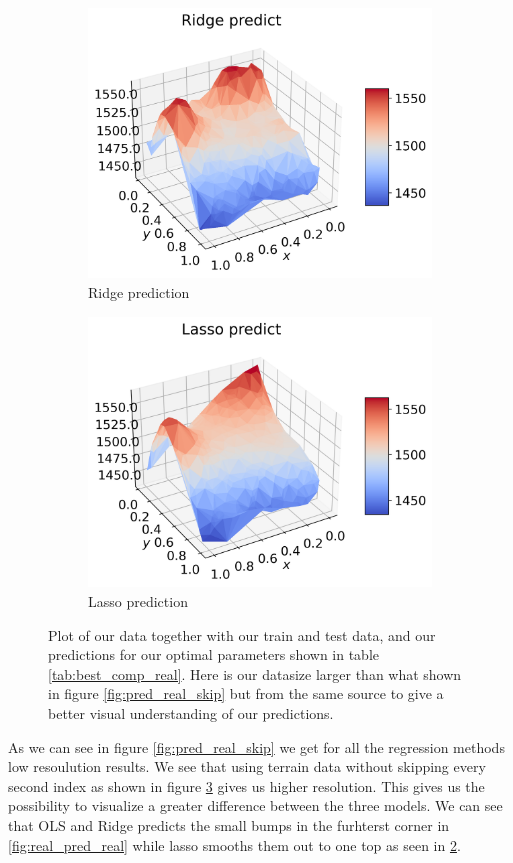 \documentclass[12pt]{article}
\begin{document}
\begin{figure}[H]
\begin{subfigure}{.5\textwidth}
    \centering
    \includegraphics[width=\textwidth]{../figures/ridge_pred_n40.png}
    \caption{Ridge prediction}
    \label{fig:real_pred_ridge}
  \end{subfigure}
  \begin{subfigure}{.5\textwidth}
    \centering
    \includegraphics[width=\textwidth]{../figures/lasso_pred_n40.png}
    \caption{Lasso prediction}
    \label{fig:real_pred_lasso}
  \end{subfigure}
  \caption{Plot of our data together with our train and test data, and our predictions for our optimal parameters shown in table \ref{tab:best_comp_real}. Here is our datasize larger than what shown in figure \ref{fig:pred_real_skip} but from the same source to give a better visual understanding of our predictions.}
  \label{fig:pred_real}
\end{figure}
As we can see in figure \ref{fig:pred_real_skip} we get for all the regression methods low resoulution results. We see that using terrain data without skipping every second index as shown in figure \ref{fig:pred_real} gives us higher resolution. This gives us the possibility to visualize a greater difference between the three models. We can see that OLS and Ridge predicts the small bumps in the furhterst corner in \ref{fig:real_pred_real} while lasso smooths them out to one top as seen in \ref{fig:real_pred_lasso}.
\end{document}
